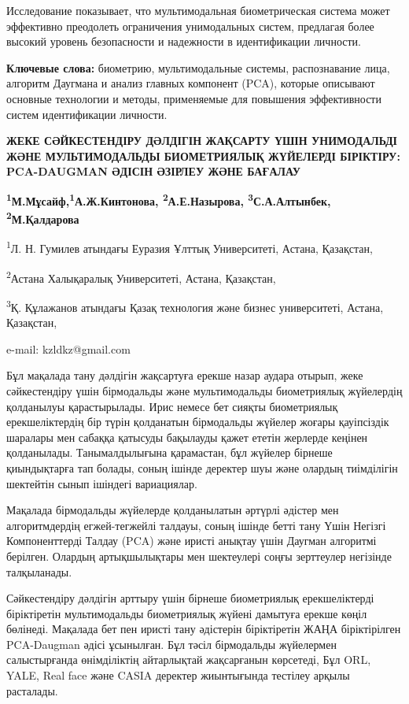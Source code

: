 Исследование показывает, что мультимодальная биометрическая система
может эффективно преодолеть ограничения унимодальных систем, предлагая
более высокий уровень безопасности и надежности в идентификации
личности.

{\bfseries Ключевые слова:} биометрию, мультимодальные системы,
распознавание лица, алгоритм Даугмана и анализ главных компонент (PCA),
которые описывают основные технологии и методы, применяемые для
повышения эффективности систем идентификации личности.

\begin{center}
{\large\bfseries ЖЕКЕ СӘЙКЕСТЕНДІРУ ДӘЛДІГІН ЖАҚСАРТУ ҮШІН УНИМОДАЛЬДІ ЖӘНЕ
МУЛЬТИМОДАЛЬДЫ БИОМЕТРИЯЛЫҚ ЖҮЙЕЛЕРДІ БІРІКТІРУ: PCA-DAUGMAN ӘДІСІН
ӘЗІРЛЕУ ЖӘНЕ БАҒАЛАУ}

{\bfseries \textsuperscript{1}М.Мұсайф\envelope,\textsuperscript{1}А.Ж.Кинтонова,
\textsuperscript{2}А.Е.Назырова, \textsuperscript{3}С.А.Алтынбек,
\textsuperscript{2}М.Қалдарова}

\textsuperscript{1}Л. Н. Гумилев атындағы Еуразия Ұлттық Университеті,
Астана, Қазақстан,

\textsuperscript{2}Астана Халықаралық Университеті, Астана, Қазақстан,

\textsuperscript{3}Қ. Құлажанов атындағы Қазақ технология және бизнес
университеті, Астана, Қазақстан,

e-mail: kzldkz@gmail.com
\end{center}

Бұл мақалада тану дәлдігін жақсартуға ерекше назар аудара отырып, жеке
сәйкестендіру үшін бірмодальды және мультимодальды биометриялық
жүйелердің қолданылуы қарастырылады. Ирис немесе бет сияқты биометриялық
ерекшеліктердің бір түрін қолданатын бірмодальды жүйелер жоғары
қауіпсіздік шаралары мен сабаққа қатысуды бақылауды қажет ететін
жерлерде кеңінен қолданылады. Танымалдылығына қарамастан, бұл жүйелер
бірнеше қиындықтарға тап болады, соның ішінде деректер шуы және олардың
тиімділігін шектейтін сынып ішіндегі вариациялар.

Мақалада бірмодальды жүйелерде қолданылатын әртүрлі әдістер мен
алгоритмдердің егжей-тегжейлі талдауы, соның ішінде бетті тану Үшін
Негізгі Компоненттерді Талдау (PCA) және иристі анықтау үшін Даугман
алгоритмі берілген. Олардың артықшылықтары мен шектеулері соңғы
зерттеулер негізінде талқыланады.

Сәйкестендіру дәлдігін арттыру үшін бірнеше биометриялық ерекшеліктерді
біріктіретін мультимодальды биометриялық жүйені дамытуға ерекше көңіл
бөлінеді. Мақалада бет пен иристі тану әдістерін біріктіретін ЖАҢА
біріктірілген PCA-Daugman әдісі ұсынылған. Бұл тәсіл бірмодальды
жүйелермен салыстырғанда өнімділіктің айтарлықтай жақсарғанын көрсетеді,
Бұл ORL, YALE, Real face және CASIA деректер жиынтығында тестілеу арқылы
расталады.

